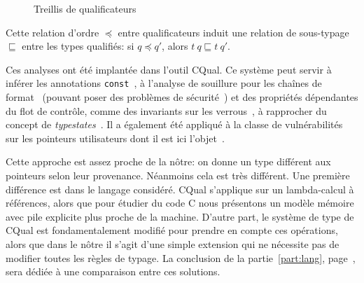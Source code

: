 \begin{figure}
\centering
{}

\caption{Treillis de qualificateurs}
\label{fig:cqual-treillis}
\end{figure}

Cette relation d'ordre $\preceq$ entre qualificateurs induit une relation de
sous-typage $\sqsubseteq$ entre les types qualifiés: si $q \preceq q'$, alors
$t~q \sqsubseteq t~q'$.

Ces analyses ont été implantée dans l'outil CQual. Ce système peut servir à
inférer les annotations \texttt{const}~\cite{pldi99}, à l'analyse de souillure
pour les chaînes de format~\cite{usenix01} (pouvant poser des problèmes de
sécurité~\cite{format-string-attacks}) et des propriétés dépendantes du flot de
contrôle, comme des invariants sur les verrous~\cite{pldi02}, à rapprocher du
concept de \emph{typestates}~\cite{tse12-typestate}. Il a également été appliqué
à la classe de vulnérabilités sur les pointeurs utilisateurs dont il est ici
l'objet~\cite{cquk-usenix04}.

Cette approche est assez proche de la nôtre: on donne un type différent aux
pointeurs selon leur provenance. Néanmoins cela est très différent. Une première
différence est dans le langage considéré. CQual s'applique sur un lambda-calcul
à références, alors que pour étudier du code C nous présentons un modèle mémoire
avec pile explicite plus proche de la machine. D'autre part, le système de type
de CQual est fondamentalement modifié pour prendre en compte ces opérations,
alors que dans le nôtre il s'agit d'une simple extension qui ne nécessite pas de
modifier toutes les règles de typage. La conclusion de la
partie~\ref{part:lang}, page~\pageref{cha:ccl2}, sera dédiée à une comparaison
entre ces solutions.

